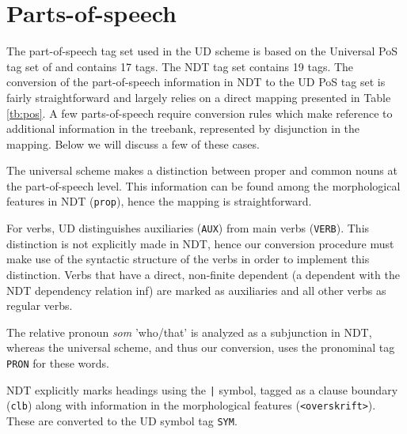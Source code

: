 \documentclass[10pt, a4paper]{article}
\begin{document}
\section{Parts-of-speech}
The part-of-speech tag set used in the UD scheme is based on the
Universal PoS tag set of  and contains 17 tags. The NDT tag set
contains 19 tags.  The conversion of the part-of-speech information in
NDT to the UD PoS tag set is fairly straightforward and largely relies
on a direct mapping presented in Table \ref{tb:pos}.  A few
parts-of-speech require conversion rules which make reference to
additional information in the treebank, represented by disjunction
in the mapping. Below we will discuss a few of these cases.


The universal scheme makes a distinction between proper and common
nouns at the part-of-speech level. This information can be found among
the morphological features in NDT ({\tt prop}), hence the mapping is
straightforward.

For verbs, UD distinguishes auxiliaries ({\tt AUX}) from main
verbs ({\tt VERB}).  This distinction is not explicitly made in
NDT, hence our conversion procedure must make use of the syntactic
structure of the verbs in order to implement this distinction. Verbs
that have a direct, non-finite dependent (a dependent with the NDT
dependency relation {\sc inf}) are marked as auxiliaries and all other
verbs as regular verbs.

The relative pronoun {\it som} 'who/that' is analyzed as a subjunction
in NDT, whereas the universal scheme, and thus our conversion, uses
the pronominal tag {\tt PRON} for these words.

NDT explicitly marks headings using the {\tt |} symbol, tagged as a
clause boundary ({\tt clb}) along with information in the
morphological features ({\tt <overskrift>}). These are converted to the
UD symbol tag {\tt SYM}.
\end{document}
